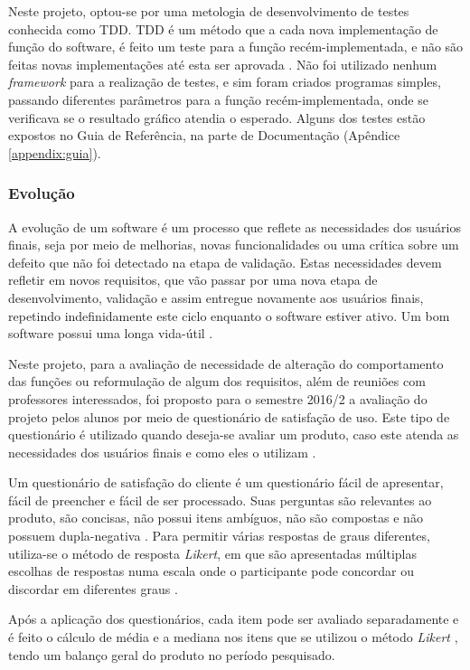 Neste projeto, optou-se por uma metologia de desenvolvimento de testes conhecida como \acrfull{TDD}. \acrshort{TDD} é um método que a cada nova implementação de função do software, é feito um teste para a função recém-implementada, e não são feitas novas implementações até esta ser aprovada \cite{sommerville}. Não foi utilizado nenhum \emph{framework} para a realização de testes, e sim foram criados programas simples, passando diferentes parâmetros para a função recém-implementada, onde se verificava se o resultado gráfico atendia o esperado. Alguns dos testes estão expostos no Guia de Referência, na parte de Documentação (Apêndice \ref{appendix:guia}).

\subsubsection{Evolução}

A evolução de um software é um processo que reflete as necessidades dos usuários finais, seja por meio de melhorias, novas funcionalidades ou uma crítica sobre um defeito que não foi detectado na etapa de validação. Estas necessidades devem refletir em novos requisitos, que vão passar por uma nova etapa de desenvolvimento, validação e assim entregue novamente aos usuários finais, repetindo indefinidamente este ciclo enquanto o software estiver ativo. Um bom software possui uma longa vida-útil \cite{sommerville}.

Neste projeto, para a avaliação de necessidade de alteração do comportamento das funções ou reformulação de algum dos requisitos, além de reuniões com professores interessados, foi proposto para o semestre 2016/2 a avaliação do projeto pelos alunos por meio de questionário de satisfação de uso. Este tipo de questionário é utilizado quando deseja-se avaliar um produto, caso este atenda as necessidades dos usuários finais e como eles o utilizam \cite{questionariodef}.

Um questionário de satisfação do cliente é um questionário fácil de apresentar, fácil de preencher e fácil de ser processado. Suas perguntas são relevantes ao produto, são concisas, não possui itens ambíguos, não são compostas e não possuem dupla-negativa \cite{questionariodef}. Para permitir várias respostas de graus diferentes, utiliza-se o método de resposta \emph{Likert}, em que são apresentadas múltiplas escolhas de respostas numa escala onde o participante pode concordar ou discordar em diferentes graus \cite{likert}.

Após a aplicação dos questionários, cada item pode ser avaliado separadamente e é feito o cálculo de média e a mediana nos itens que se utilizou o método \emph{Likert} \cite{likert}, tendo um balanço geral do produto no período pesquisado.


